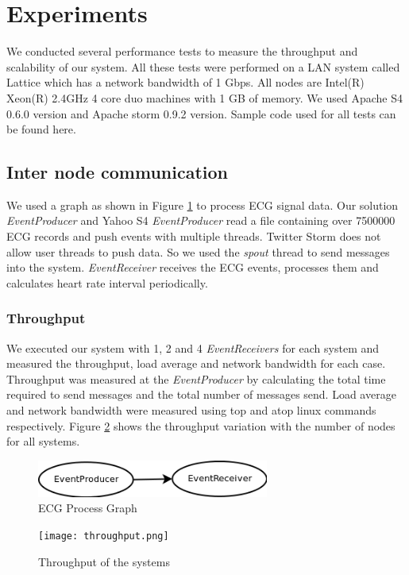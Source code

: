 \section{Experiments}

We conducted several performance tests to measure the throughput and scalability of our system. All these tests were performed on a LAN system called Lattice which has a network bandwidth of 1 Gbps. All nodes are Intel(R) Xeon(R) 2.4GHz 4 core duo machines with 1 GB of memory. We used Apache S4 0.6.0 version and Apache storm 0.9.2 version. Sample code used for all tests can be found here\cite{solutionCode}.


\subsection{Inter node communication}
We used a graph as shown in Figure \ref{ecgGraph} to process ECG signal data. Our solution \textit{EventProducer} and Yahoo S4\cite{neumeyer2010s4} \textit{EventProducer} read a file containing over 7500000 ECG records and push events with multiple threads. Twitter Storm\cite{twitterStorm} does not allow user threads to push data. So we used the \textit{spout} thread to send messages into the system. \textit{EventReceiver}  receives the ECG events, processes them and calculates heart rate interval periodically.  
\subsubsection{Throughput}
We executed our system with 1, 2 and 4  \textit{EventReceivers} for each system and measured the throughput, load average and network bandwidth for each case. Throughput was measured at the \textit{EventProducer} by calculating the total time required to send messages and the total number of messages send. Load average and network bandwidth were measured using top and atop linux commands respectively. Figure \ref{throuput} shows the throughput variation with the number of nodes for all systems. 

\begin{figure}[!t]
        \centering
        \includegraphics[width=3.0in]{ecgGraph.png}
        \caption{ECG Process Graph}
        \label{ecgGraph}
\end{figure}
\begin{figure}[!t]
        \centering
        \texttt{[image: throughput.png]}
        \caption{Throughput of the systems}
        \label{throuput}
\end{figure}

